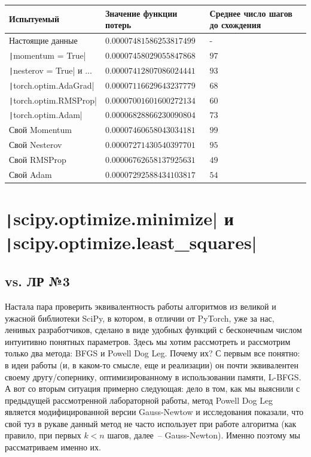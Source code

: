 \documentclass[12pt, a4paper, oneside, final]{article}
\begin{document}
	\begin{table}[H]
		\centering
		\begin{tabular}{l|l|l}
			Испытуемый & Значение функции потерь & Среднее число шагов до схождения \\ \hline
			Настоящие данные & $0.00007481586253817499$ & - \\
			\texttt|momentum = True| & $0.00007458029055847868$ & $97$ \\
			\texttt|nesterov = True| и ... & $0.00007412807086024441$ & $93$ \\
			\texttt|torch.optim.AdaGrad| & $0.00007116629643237779$ & $68$ \\
			\texttt|torch.optim.RMSProp| & $0.00007001601600272134$ & $60$ \\
			\texttt|torch.optim.Adam| & $0.00006828866230090804$ & $73$ \\
			Свой Momentum & $0.00007460658043034181$ & $99$ \\
			Свой Nesterov & $0.00007271430540397701$ & $95$ \\
			Свой RMSProp & $0.00006762658137925631$ & $49$ \\
			Свой Adam & $0.00007292588434103817$ & $54$
		\end{tabular}
	\end{table}
	\newpage
	\section*{\texttt|scipy.optimize.minimize| и \texttt|scipy.optimize.least_squares|}
	\subsection*{vs. ЛР №3}
	Настала пара проверить эквивалентность работы алгоритмов из великой и ужасной библиотеки SciPy, в котором, в отличии от PyTorch, уже за нас, ленивых разработчиков, сделано в виде удобных функций с бесконечным числом интуитивно понятных параметров.
	Здесь мы хотим рассмотреть и рассмотрим только два метода: BFGS и Powell Dog Leg.
	Почему их?
	С первым все понятно: в идеи работы (и, в каком-то смысле, еще и реализации) он почти эквивалентен своему другу/сопернику, оптимизированному в использовании памяти, L-BFGS.
	А вот со вторым ситуация примерно следующая: дело в том, как мы выяснили с предыдущей рассмотренной лабораторной работы, метод Powell Dog Leg является модифицированной версии Gauss-Newtow и исследования показали, что свой туз в рукаве данный метод не часто использует при работе алгоритма (как правило, при первых $k < n$ шагов, далее~-- Gauss-Newton).
	Именно поэтому мы рассматриваем именно их.
\end{document}
